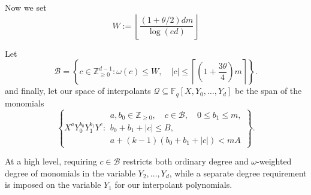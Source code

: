 \documentclass[11pt]{article}
\begin{document}
Now we set
\begin{equation}\label{eq:W-def}
    W := \left\lfloor \frac{(1+\theta/2) dm}{\log(ed)} \right \rfloor 
\end{equation}

Let
\[
\mathcal B
=
\left\{
c\in\mathbb Z_{\ge0}^{d-1}:
\omega(c)\le W,\quad
|c|\le \left \lceil \left(1 + \frac{3\theta}{4} \right) m \right \rceil
\right\}.
\]
and finally, let our space of interpolants  $\mathcal Q
\subseteq
\mathbb F_q[X,Y_0,\ldots,Y_{d}]$
be the span of the monomials
\begin{equation}\label{eq:global-space}
\left\{
X^aY_0^{b_0}Y_1^{b_1}Y^c:
\begin{array}{l}
a,b_0\in\mathbb Z_{\ge0},\quad
c\in\mathcal B,\quad
0\le b_1\le m,\\
b_0+b_1+|c|\le B,\\
a+(k-1)(b_0+b_1+|c|)<mA
\end{array}
\right\}.
\end{equation}

At a high level, requiring $c \in \mathcal{B}$ restricts both ordinary degree and $\omega$-weighted degree of monomials in the variable $Y_2, \ldots, Y_d$, while a separate degree requirement is imposed on the variable $Y_1$ for our interpolant polynomials. 
\end{document}

